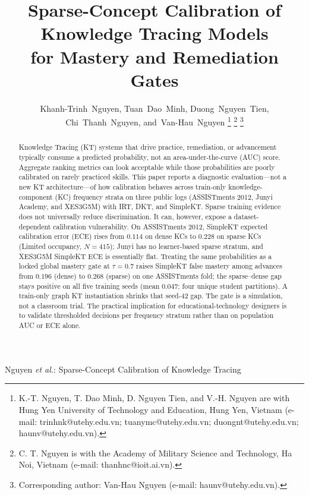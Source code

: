 \documentclass[journal,10pt,twocolumn]{IEEEtran}
\begin{document}
\title{Sparse-Concept Calibration of Knowledge Tracing Models\\
for Mastery and Remediation Gates}

\author{Khanh-Trinh~Nguyen,
Tuan~Dao~Minh,
Duong~Nguyen~Tien,
Chi~Thanh~Nguyen,
and~Van-Hau~Nguyen%
\thanks{K.-T. Nguyen, T. Dao Minh, D. Nguyen Tien, and V.-H. Nguyen are with Hung Yen University of Technology and Education, Hung Yen, Vietnam (e-mail: trinhnk@utehy.edu.vn; tuanymc@utehy.edu.vn; duongnt@utehy.edu.vn; haunv@utehy.edu.vn).}%
\thanks{C. T. Nguyen is with the Academy of Military Science and Technology, Ha Noi, Vietnam (e-mail: thanhnc@ioit.ai.vn).}%
\thanks{Corresponding author: Van-Hau Nguyen (e-mail: haunv@utehy.edu.vn).}}

%
{Nguyen \MakeLowercase{\textit{et al.}}: Sparse-Concept Calibration of Knowledge Tracing}

\maketitle

\begin{abstract}
Knowledge Tracing (KT) systems that drive practice, remediation, or advancement typically consume a predicted probability, not an area-under-the-curve (AUC) score. Aggregate ranking metrics can look acceptable while those probabilities are poorly calibrated on rarely practiced skills. This paper reports a diagnostic evaluation---not a new KT architecture---of how calibration behaves across train-only knowledge-component (KC) frequency strata on three public logs (ASSISTments 2012, Junyi Academy, and XES3G5M) with IRT, DKT, and SimpleKT. Sparse training evidence does not universally reduce discrimination. It can, however, expose a dataset-dependent calibration vulnerability. On ASSISTments 2012, SimpleKT expected calibration error (ECE) rises from $0.114$ on dense KCs to $0.228$ on sparse KCs (Limited occupancy, $N=415$); Junyi has no learner-based sparse stratum, and XES3G5M SimpleKT ECE is essentially flat. Treating the same probabilities as a locked global mastery gate at $\tau=0.7$ raises SimpleKT false mastery among advances from $0.196$ (dense) to $0.268$ (sparse) on one ASSISTments fold; the sparse--dense gap stays positive on all five training seeds (mean $0.047$; four unique student partitions). A train-only graph KT instantiation shrinks that seed-42 gap. The gate is a simulation, not a classroom trial. The practical implication for educational-technology designers is to validate thresholded decisions per frequency stratum rather than on population AUC or ECE alone.
\end{abstract}
\end{document}
